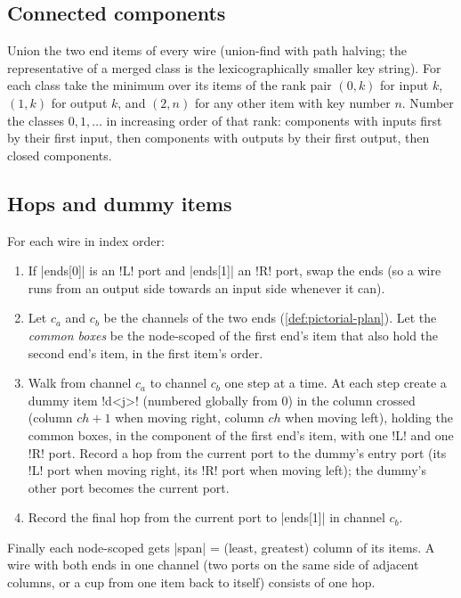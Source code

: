 \subsection{Connected components}\label{sec:pictorial-components}

\begin{algorithm}\label{alg:pictorial-components}
Union the two end items of every wire (union-find with path halving; the representative of a
merged class is the lexicographically smaller key string). For each class take the minimum over
its items of the rank pair $(0, k)$ for input $k$, $(1, k)$ for output $k$, and $(2, n)$ for any
other item with key number $n$. Number the classes $0, 1, \dots$ in increasing order of that
rank: components with inputs first by their first input, then components with outputs by their
first output, then closed components.
\end{algorithm}

\subsection{Hops and dummy items}\label{sec:pictorial-hops}

\begin{algorithm}\label{alg:pictorial-hops}
For each wire in index order:
\begin{enumerate}
  \item If \py|ends[0]| is an \code!L! port and \py|ends[1]| an \code!R! port, swap the ends (so
    a wire runs from an output side towards an input side whenever it can).
  \item Let $c_a$ and $c_b$ be the channels of the two ends (\cref{def:pictorial-plan}). Let the
    \emph{common boxes} be the node-scoped \bboxes{} of the first end's item that also hold the
    second end's item, in the first item's order.
  \item Walk from channel $c_a$ to channel $c_b$ one step at a time. At each step create a dummy
    item \code!d<j>! (numbered globally from 0) in the column crossed (column $\mathit{ch}+1$
    when moving right, column $\mathit{ch}$ when moving left), holding the common boxes, in the
    component of the first end's item, with one \code!L! and one \code!R! port. Record a hop from
    the current port to the dummy's entry port (its \code!L! port when moving right, its \code!R!
    port when moving left); the dummy's other port becomes the current port.
  \item Record the final hop from the current port to \py|ends[1]| in channel $c_b$.
\end{enumerate}
Finally each node-scoped \bbox{} gets \py|span| = (least, greatest) column of its items. A wire
with both ends in one channel (two ports on the same side of adjacent columns, or a cup from
one item back to itself) consists of one hop.
\end{algorithm}

